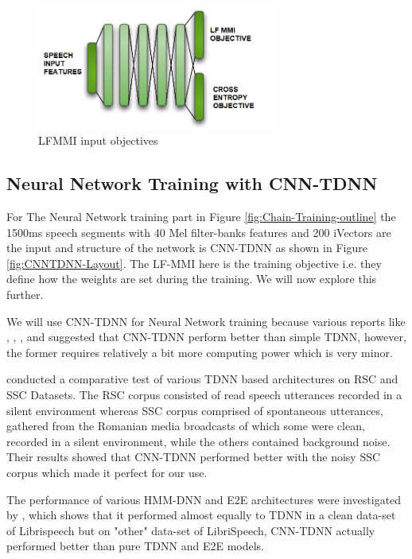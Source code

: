 \begin{figure}
    \centering
    \includegraphics[width=0.7\textwidth]{img/LFMMI-crossent.png}
    \caption{LFMMI input objectives}
    \label{fig:LFMMI-INPUT}
\end{figure}

\subsection{Neural Network Training with CNN-TDNN}

For The Neural Network training part in Figure \ref{fig:Chain-Training-outline} the 1500ms speech segments with 40 Mel filter-banks features and 200 iVectors are the input and structure of the network is CNN-TDNN as shown in Figure \ref{fig:CNNTDNN-Layout}. The LF-MMI here is the training objective i.e. they define how the weights are set during the training. We will now explore this further.  

We will use CNN-TDNN for Neural Network training because various reports like \cite{abdel-hamid_convolutional_2014}, \cite{zorila_investigation_2019}, \cite{biswas_semi-supervised_2019}, \cite{noauthor_tdnn_nodate} \cite{georgescu_kaldi-based_2019} and \cite{kreyssig_improved_2018} suggested that CNN-TDNN perform better than simple TDNN, however, the former requires relatively a bit more computing power \cite{georgescu_performance_2021} which is very minor. 

\cite{georgescu_kaldi-based_2019} conducted a comparative test of various TDNN based architectures on RSC and SSC Datasets. The RSC corpus consisted of read speech utterances recorded in a silent environment whereas SSC corpus comprised of spontaneous utterances, gathered from the Romanian media broadcasts of which some were clean, recorded in a silent environment, while the others contained background noise. Their results showed that CNN-TDNN performed better with the noisy SSC corpus which made it perfect for our use.

The performance of various HMM-DNN and E2E architectures were investigated by \cite{georgescu_performance_2021}, which shows that it performed almost equally to TDNN in a clean data-set of Librispeech but on "other" data-set of LibriSpeech, CNN-TDNN actually performed better than pure TDNN and E2E models. 

